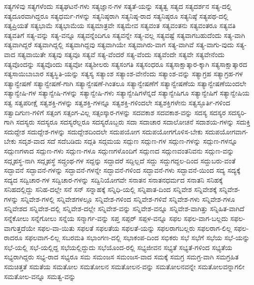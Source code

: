 {ಸತ್ಯಗಳಿವು
ಸತ್ಯಗಳೆಂದು
ಸತ್ಯಘಟನೆ-ಗಳು
ಸತ್ಯಜ್ಞಾನ-ಗಳ
ಸತ್ಯತೆ-ಯನ್ನು
ಸತ್ಯತ್ವ
ಸತ್ಯದ
ಸತ್ಯದರ್ಶನ
ಸತ್ಯ-ದಲ್ಲಿ
ಸತ್ಯದೂರವಾಗಿದ್ದರೂ
ಸತ್ಯಧರ್ಮ-ಗಳನ್ನು
ಸತ್ಯನಿಷ್ಠರಾಗಿ
ಸತ್ಯನಿಷ್ಠ-ರಾದ
ಸತ್ಯನಿಷ್ಠರೂ
ಸತ್ಯನಿಷ್ಠೆ
ಸತ್ಯಪಥ-ದಲ್ಲಿ
ಸತ್ಯಪ್ರಿಯತೆ
ಸತ್ಯಭಾಮೆ
ಸತ್ಯಭಾಮೆಯ
ಸತ್ಯಮಾತ್ರವೇ
ಸತ್ಯಮೇವ
ಸತ್ಯವಂತ
ಸತ್ಯವಂತನು
ಸತ್ಯವಂತರೂ
ಸತ್ಯವತಿ
ಸತ್ಯವತಿಗೆ
ಸತ್ಯ-ವನ್ನು
ಸತ್ಯ-ವನ್ನೂ
ಸತ್ಯವನ್ನೆಂದಿಗೂ
ಸತ್ಯವನ್ನೇ
ಸತ್ಯ-ವಲ್ಲ
ಸತ್ಯವಷ್ಟೆ
ಸತ್ಯವಾಗಬಹುದೆಂದು
ಸತ್ಯ-ವಾಗಿ
ಸತ್ಯವಾಗಿದ್ದರೆ
ಸತ್ಯವಾಗಿದ್ದಲ್ಲಿ
ಸತ್ಯವಾಗಿದ್ದವು
ಸತ್ಯವಾಗಿಯೇ
ಸತ್ಯವಾಗಿರು-ವಾಗ
ಸತ್ಯ-ವಾಗಿವೆ
ಸತ್ಯ-ವಾಗು-ವುದು
ಸತ್ಯ-ವಾದ
ಸತ್ಯವಾಯಿತೇ
ಸತ್ಯವು
ಸತ್ಯವೂ
ಸತ್ಯವೆ
ಸತ್ಯ-ವೆಂದರೆ
ಸತ್ಯ-ವೆಂದು
ಸತ್ಯವೆಂದೇ
ಸತ್ಯವೇ
ಸತ್ಯವೇನೆಂದು
ಸತ್ಯವೊಂದನ್ನು
ಸತ್ಯವೊಂದು
ಸತ್ಯವೋ
ಸತ್ಯಶೀಲರು
ಸತ್ಯಸಂಗತಿ
ಸತ್ಯಸಂಧರೂ
ಸತ್ಯಸಾಕ್ಷಾತ್ಕಾರ-ಕ್ಕಾಗಿ
ಸತ್ಯಸಾಕ್ಷಾತ್ಕಾರದ
ಸತ್ಯಸಾಯಿಬಾಬಾರ
ಸತ್ಯಸ್ಥಿತಿ-ಯನ್ನು
ಸತ್ಯಸ್ಯ
ಸತ್ಯಾಂಶ
ಸತ್ಯಾಂಶ-ವೇನೆಂದು
ಸತ್ಯಾಂಶ-ವನ್ನು
ಸತ್ಯಾಗ್ರಹ
ಸತ್ಯಾಗ್ರಹ-ಗಳ
ಸತ್ಯಾನ್ವೇಷಣೆ
ಸತ್ಯಾನ್ವೇಷಣೆ-ಗಾಗಿ
ಸತ್ಯಾನ್ವೇಷಣೆ-ಗಿಂತಲೂ
ಸತ್ಯಾನ್ವೇಷಣೆಗೆ
ಸತ್ಯಾನ್ವೇಷಣೆಯ
ಸತ್ಯಾನ್ವೇಷಣೆಯಿಂದಲೇ
ಸತ್ಯಾನ್ವೇಷಿ-ಗಳ
ಸತ್ಯಾನ್ವೇಷಿ-ಗಳನ್ನು
ಸತ್ಯಾನ್ವೇಷಿ-ಗಳು
ಸತ್ಯಾನ್ವೇಷಿಗಳೆನ್ನದೆ
ಸತ್ಯಾನ್ವೇಷಿಗೂ
ಸತ್ಯಾನ್ವೇಷಿಗೆ
ಸತ್ಯಾನ್ವೇಷಿಯ
ಸತ್ವ
ಸತ್ವಪರೀಕ್ಷೆ
ಸತ್ವಶಕ್ತಿ-ಗಳನ್ನು
ಸತ್ವಶಕ್ತಿ-ಗಳನ್ನೂ
ಸತ್ವಶಕ್ತಿ-ಗಳಿಂದಲೇ
ಸತ್ವಶಕ್ತಿಗಳೇನು
ಸತ್ವಸ್ಫೂರ್ತಿ-ಗಳಿಂದ
ಸತ್ವಾದಿಗುಣ-ಗಳಿಗೆ
ಸತ್ಸಂಗ
ಸತ್ಸಂಗ-ವಿಲ್ಲ
ಸತ್ಸಂಸ್ಕಾರ-ಗಳನ್ನು
ಸದವಕಾಶ
ಸದವಕಾಶ-ವನ್ನು
ಸದಸ್ಯ
ಸದಸ್ಯರ
ಸದಸ್ಯರಿ-ಗಾಗಿ
ಸದಸ್ಯರು
ಸದಸ್ಯರೂ
ಸದಸ್ಯರೆಲ್ಲರೂ
ಸದಸ್ಯರೊಬ್ಬರು
ಸದಾ
ಸದಾಚಾರ
ಸದಾಲೋಚನೆ
ಸದಾಶಯ-ಗಳನ್ನು
ಸದುಕ್ತಿ
ಸದುದ್ದೇಶ
ಸದುದ್ದೇಶ-ಗಳನ್ನು
ಸದುದ್ದೇಶದಿಂದಲೇ
ಸದುಪಯೋಗ
ಸದುಪಯೋಗಗೊಳಿಸ-ಬೇಕು
ಸದುಪಯೋಗವಾಗ-ಬೇಕು
ಸದೃಶ-ವಾದ
ಸದೆ
ಸದೆಬಡಿದು
ಸದ್ಗತಿ
ಸದ್ಗಮಯ
ಸದ್ಗುಣ
ಸದ್ಗುಣ-ಗಳ
ಸದ್ಗುಣ-ಗಳನ್ನು
ಸದ್ಗುಣ-ಗಳನ್ನೂ
ಸದ್ಗುಣಗಳಾದ
ಸದ್ಗುಣ-ಗಳು
ಸದ್ಗುಣ-ಗಳೂ
ಸದ್ಗುಣಗಳೊಂದಿಗೆ
ಸದ್ಗುಣದ
ಸದ್ಗುಣವಂತನಿವನು
ಸದ್ಗುಣ-ವನ್ನು
ಸದ್ಗೃಹಸ್ಥ-ನಾಗಿ
ಸದ್ಗೃಹಸ್ಥೆ
ಸದ್ಗ್ರಂಥ-ಗಳ
ಸದ್ದನ್ನು
ಸದ್ದಾದರೆ
ಸದ್ದಿಲ್ಲದೆ
ಸದ್ದು
ಸದ್ದುಗದ್ದಲ-ದಿಂದ
ಸದ್ದುಬರು-ವಂತೆ
ಸದ್ಭಾವನೆ
ಸದ್ಭಾವನೆ-ಗಳನ್ನು
ಸದ್ಭಾವನೆ-ಗಳನ್ನೇ
ಸದ್ಭಾವನೆ-ಗಳಿಂದ
ಸದ್ಭಾವನೆ-ಗಳು
ಸದ್ಭಾವನೆ-ಯಿಂದ
ಸದ್ಯ
ಸದ್ಯಕ್ಕೆ
ಸದ್ಯದ
ಸದ್ವಿಚಾರ-ಗಳ
ಸದ್ವಿಚಾರ-ಗಳನ್ನು
ಸದ್ವಿನಿಯೋಗವೇ
ಸನಾತನ
ಸನಾತನಧರ್ಮದ
ಸನಾತನಿ
ಸನಿಹಕ್ಕೆ
ಸನಿಹದಲ್ಲಿದ್ದು
ಸನಿಹ-ದಲ್ಲೇ
ಸನೆ
ಸನ್
ಸನ್ನಾಹಕ್ಕೆ
ಸನ್ನಿಧಿ-ಯಲ್ಲಿ
ಸನ್ನಿಪಾತ-ದಿಂದ
ಸನ್ನಿವೇಶ
ಸನ್ನಿವೇಶಕ್ಕೆ
ಸನ್ನಿವೇಶ-ಗಳನ್ನು
ಸನ್ನಿವೇಶ-ಗಳಲ್ಲಿ
ಸನ್ನಿವೇಶಗಳಲ್ಲೂ
ಸನ್ನಿವೇಶ-ಗಳಿಂದ
ಸನ್ನಿವೇಶ-ಗಳಿವೆ
ಸನ್ನಿವೇಶ-ಗಳು
ಸನ್ನಿವೇಶ-ಗಳೂ
ಸನ್ನಿವೇಶದ
ಸನ್ನಿವೇಶ-ದಲ್ಲಿ
ಸನ್ನಿವೇಶ-ದಲ್ಲೇ
ಸನ್ನಿವೇಶ-ವನ್ನು
ಸನ್ನಿವೇಶ-ವನ್ನೂ
ಸನ್ನಿವೇಶ-ವಾಗಿತ್ತು
ಸನ್ನಿಹಿತ-ವಾಗಿದೆ
ಸನ್ನೆಕೋಲು
ಸನ್ನೆಗೋಲು
ಸನ್ನೆಯ
ಸನ್ಮಾರ್ಗ-ವನ್ನು
ಸಪ್ತ
ಸಪ್ಪರ್
ಸಪ್ಪಳ-ವನ್ನೂ
ಸಫಲ
ಸಫಲ-ವಾಗ-ಬಲ್ಲದು
ಸಫಲ-ವಾಗುತ್ತದೆಯೇ
ಸಫಲ-ವಾ-ಯಿತು
ಸಫಲತೆ
ಸಫಲತೆಯ
ಸಫಲತೆ-ಯನ್ನು
ಸಫಲರಾಗಬಲ್ಲರು
ಸಫಲರಾಗ-ಲಿಲ್ಲ
ಸಫಲ-ರಾದರೂ
ಸಫಲವಾಗ-ಲಿಲ್ಲ
ಸಬರಮತಿ
ಸಭಾಂಗಣ-ದಲ್ಲಿ
ಸಭಾಕಂಪ-ದಿಂದ
ಸಭಿಕರು
ಸಭೆ
ಸಭೆಗೆ
ಸಭೆಯ
ಸಭೆ-ಯನ್ನು
ಸಭೆ-ಯಲ್ಲಿ
ಸಭೆ-ಯಲ್ಲಿದ್ದ
ಸಭೆಯಲ್ಲಿದ್ದುದು
ಸಭೆಯೊಂದ-ರಲ್ಲಿ
ಸಭ್ಯಜೀವನ
ಸಭ್ಯತೆ
ಸಭ್ಯತೆ-ಗಳಿಂದ
ಸಭ್ಯತೆಯ
ಸಭ್ಯರಾಗಿದ್ದರು
ಸಭ್ಯ-ರಾದ
ಸಭ್ಯರೂ
ಸಮ
ಸಮಂಜಸ
ಸಮಂಜಸ-ವಾದ
ಸಮಕ್ಕೆ
ಸಮಗ್ರ
ಸಮಗ್ರ-ವಾಗಿ
ಸಮಗ್ರಹಿತ
ಸಮಚಿತ್ತತೆ
ಸಮತೆಯ
ಸಮತೋಲ
ಸಮತೋಲನ
ಸಮತೋಲನ-ವನ್ನು
ಸಮತೋಲನವನ್ನೇ
ಸಮತೋಲವನ್ನಾಗಲೀ
ಸಮತೋಲ-ವನ್ನೂ
ಸಮತ್ವ-ವನ್ನು
}
